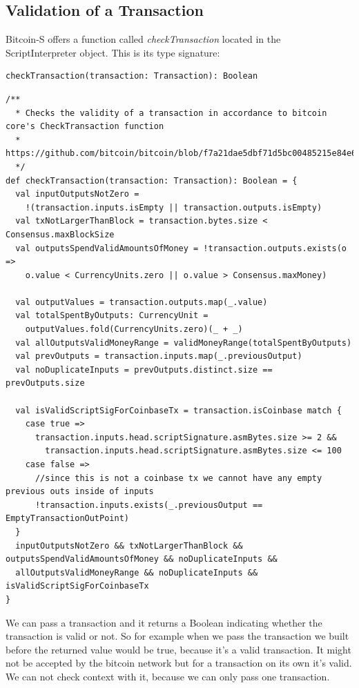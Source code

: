 \documentclass[runningheads]{llncs}
\begin{document}
\subsection{Validation of a Transaction}

Bitcoin-S offers a function called \emph{checkTransaction} located in the ScriptInterpreter object.
This is its type signature:
\begin{lstlisting}[style=scala]
  checkTransaction(transaction: Transaction): Boolean
\end{lstlisting}

\begin{lstlisting}[style=scala]
/**
  * Checks the validity of a transaction in accordance to bitcoin core's CheckTransaction function
  * https://github.com/bitcoin/bitcoin/blob/f7a21dae5dbf71d5bc00485215e84e6f2b309d0a/src/main.cpp#L939.
  */
def checkTransaction(transaction: Transaction): Boolean = {
  val inputOutputsNotZero =
    !(transaction.inputs.isEmpty || transaction.outputs.isEmpty)
  val txNotLargerThanBlock = transaction.bytes.size < Consensus.maxBlockSize
  val outputsSpendValidAmountsOfMoney = !transaction.outputs.exists(o =>
    o.value < CurrencyUnits.zero || o.value > Consensus.maxMoney)

  val outputValues = transaction.outputs.map(_.value)
  val totalSpentByOutputs: CurrencyUnit =
    outputValues.fold(CurrencyUnits.zero)(_ + _)
  val allOutputsValidMoneyRange = validMoneyRange(totalSpentByOutputs)
  val prevOutputs = transaction.inputs.map(_.previousOutput)
  val noDuplicateInputs = prevOutputs.distinct.size == prevOutputs.size

  val isValidScriptSigForCoinbaseTx = transaction.isCoinbase match {
    case true =>
      transaction.inputs.head.scriptSignature.asmBytes.size >= 2 &&
        transaction.inputs.head.scriptSignature.asmBytes.size <= 100
    case false =>
      //since this is not a coinbase tx we cannot have any empty previous outs inside of inputs
      !transaction.inputs.exists(_.previousOutput == EmptyTransactionOutPoint)
  }
  inputOutputsNotZero && txNotLargerThanBlock && outputsSpendValidAmountsOfMoney && noDuplicateInputs &&
  allOutputsValidMoneyRange && noDuplicateInputs && isValidScriptSigForCoinbaseTx
}
\end{lstlisting}

We can pass a transaction and it returns a Boolean indicating whether
the transaction is valid or not.  So for example when we pass the
transaction we built before the returned value would be true, because
it's a valid transaction.  It might not be accepted by the bitcoin
network but for a transaction on its own it's valid.  We can not check
context with it, because we can only pass one transaction.
\end{document}
